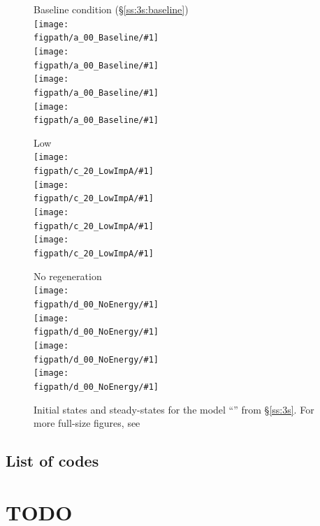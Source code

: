 \documentclass[12pt,notitlepage]{article}
\begin{document}
\begin{figure}
	\centering

	\newcommand{\figpath}{20211018-Appli/checkpoint/20211121-124149/plot_ss}
	
	\begin{minipage}{0.32\textwidth}
		\newcommand\fig[1]{\texttt{[image: \\figpath/a\_00\_Baseline/\#1]}}
		\centering
		Baseline condition (\S\ref{ss:3s:baseline})
		\\
		\fig{Free ImpA}
		\\
		\fig{Free ImpB}
		\\
		\fig{Free CAS}
		\\
		\fig{Free NLS}
	\end{minipage}
	\begin{minipage}{0.32\textwidth}
		\newcommand\fig[1]{\texttt{[image: \\figpath/c\_20\_LowImpA/\#1]}}
		\centering
		Low 
		\\
		\fig{Free ImpA}
		\\
		\fig{Free ImpB}
		\\
		\fig{Free CAS}
		\\
		\fig{Free NLS}
	\end{minipage}
	\begin{minipage}{0.32\textwidth}
		\newcommand\fig[1]{\texttt{[image: \\figpath/d\_00\_NoEnergy/\#1]}}
		\centering
		No  regeneration
		\\
		\fig{Free ImpA}
		\\
		\fig{Free ImpB}
		\\
		\fig{Free CAS}
		\\
		\fig{Free NLS}
	\end{minipage}
	
	\protect{}
	
	\protect{}
		
	\caption{%
		Initial states and steady-states for the model 
		``'' from \S\ref{ss:3s}.
		For more full-size figures, see
		\protect{}
	}
	\label{f:app:3s-plot-ss}
\end{figure}


\subsection{List of codes}

\begin{center}
\SHOWCODES
\end{center}




\section{TODO}
\SHOWTODOS



\leavevmode\vfill{\tiny\color{lightgray}\hfill{\DTMnow}}
\end{document}
